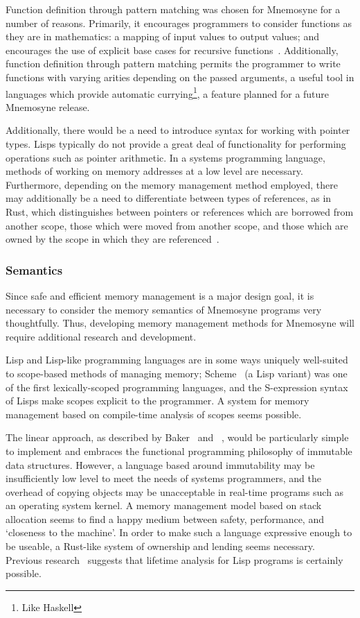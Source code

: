 \documentclass[11pt,a4paper]{article}
\theoremstyle{break}
\begin{document}
Function definition through pattern matching was chosen for Mnemosyne for a number of reasons. Primarily, it encourages programmers to consider functions as they are in mathematics: a mapping of input values to output values; and encourages the use of explicit base cases for recursive functions~\cite{hudak1992gentle}. Additionally, function definition through pattern matching permits the programmer to write functions with varying arities depending on the passed arguments, a useful tool in languages which provide automatic currying\footnote{Like Haskell}, a feature planned for a future Mnemosyne release.

Additionally, there would be a need to introduce syntax for working with pointer types. Lisps typically do not provide a great deal of functionality for performing operations such as pointer arithmetic. In a systems programming language, methods of working on memory addresses at a low level are necessary. Furthermore, depending on the memory management method employed, there may additionally be a need to differentiate between types of references, as in Rust, which distinguishes between pointers or references which are borrowed from another scope, those which were moved from another scope, and those which are owned by the scope in which they are referenced~\cite{Matsakis:2014:RL:2663171.2663188}.

\subsubsection{Semantics}

Since safe and efficient memory management is a major design goal, it is necessary to consider the memory semantics of Mnemosyne programs very thoughtfully. Thus, developing memory management methods for Mnemosyne will require additional research and development.

Lisp and Lisp-like programming languages are in some ways uniquely well-suited to scope-based methods of managing memory; Scheme~\cite{r6rs} (a Lisp variant) was one of the first lexically-scoped programming languages, and the S-expression syntax of Lisps make scopes explicit to the programmer. A system for memory management based on compile-time analysis of scopes seems possible.

The linear approach, as described by Baker~\cite{Baker:1992:LLL:142137.142162,Baker:1995:UVL:199818.199860} and \citeauthor{hawblitzel2004low}~\cite{hawblitzel2004low}, would be particularly simple to implement and embraces the functional programming philosophy of immutable data structures. However, a language based around immutability may be insufficiently low level to meet the needs of systems programmers, and the overhead of copying objects may be unacceptable in real-time programs such as an operating system kernel. A memory management model based on stack allocation seems to find a happy medium between safety, performance, and `closeness to the machine'. In order to make such a language expressive enough to be useable, a Rust-like system of ownership and lending seems necessary. Previous research~\cite{sobalvarro1988lifetime} suggests that lifetime analysis for Lisp programs is certainly possible.
\end{document}
